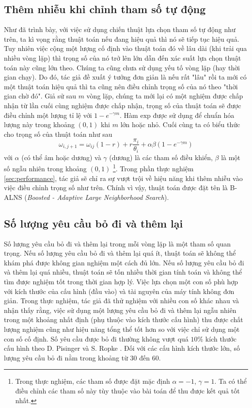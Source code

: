 \subsection{Thêm nhiễu khi chỉnh tham số tự động}
Như đã trình bày, với việc sử dụng chiến thuật lựa chọn tham số tự động như trên, ta kì vọng rằng thuật toán nếu đang hiệu quả thì nó sẽ tiếp tục hiệu quả. Tuy nhiên việc cộng một lượng cố định vào thuật toán đó về lâu dài (khi trải qua nhiều vòng lặp) thì trọng số của nó trở lên lớn dẫn đến xác suất lựa chọn thuật toán này cũng lớn theo. Chúng ta cũng chưa sử dụng yếu tố vòng lặp (hay thời gian chạy). Do đó, tác giả đề xuất ý tưởng đơn giản là nếu rất "lâu" rồi ta mới có một thuật toán hiệu quả thì ta cũng nên điều chỉnh trọng số của nó theo "thời gian chờ đó". Giả sử sau $m$ vòng lặp, chúng ta mới lại có một nghiệm được chấp nhận từ lần cuối cùng nghiệm được chấp nhận, trọng số của thuật toán sẽ được điều chỉnh một lượng tỉ lệ với $1 - e^{-\gamma m}$. Hàm $\text{exp}$ được sử dụng để chuẩn hóa lượng này trong khoảng $(0,1)$ khi $m$ lớn hoặc nhỏ. Cuối cùng ta có biểu thức cho trọng số của thuật toán như sau
\begin{equation}
	\label{eq:boost_adaptive_weight}
	\omega_{i, j+1} = \omega_{ij}(1-r)+r\frac{\pi_i} {\theta_i} + \alpha \beta (1 - e^{-\gamma m})
\end{equation}
với $\alpha$ (có thể âm hoặc dương) và $\gamma$ (dương) là các tham số điều khiển, $\beta$ là một số ngẫu nhiên trong khoảng $(0,1)$ \footnote[1]{Trong thực nghiệm, các tham số được đặt mặc định $\alpha = -1$, $\gamma = 1$. Ta có thể điều chỉnh các tham số này tùy thuộc vào bài toán để thu được kết quả tốt nhất.}. Trong phần thực nghiệm \ref{sec:performance}, tác giả sẽ chỉ ra sự vượt trội về hiệu năng khi thêm nhiễu vào việc điều chỉnh trọng số như trên. Chính vì vậy, thuật toán được đặt tên là B-ALNS (\textit{Boosted - Adaptive Large Neighborhood Search}).

\subsection{Số lượng yêu cầu bỏ đi và thêm lại}
\label{sec:num_rm_req}
Số lượng yêu cầu bỏ đi và thêm lại trong mỗi vòng lặp là một tham số quan trọng. Nếu số lượng yêu cầu bỏ đi và thêm lại quá ít, thuật toán sẽ không thể khám phá được không gian nghiệm một cách đủ lớn. Nếu số lượng yêu cầu bỏ đi và thêm lại quá nhiều, thuật toán sẽ tốn nhiều thời gian tính toán và không thể tìm được nghiệm tốt trong thời gian hợp lý. Việc lựa chọn một con số phù hợp với kích thước của cấu hình (đầu vào) và tài nguyên của máy tính không đơn giản. Trong thực nghiệm, tác giả đã thử nghiệm với nhiều con số khác nhau và nhận thấy rằng, việc sử dụng một lượng yêu cầu bỏ đi và thêm lại ngẫu nhiên trong một khoảng nhất định (phụ thuộc vào kích thước cấu hình) thu được chất lượng nghiệm cũng như hiệu năng tổng thể tốt hơn so với việc chỉ sử dụng một con số cố định. Số yêu cầu được bỏ đi thường không vượt quá $10\%$ kích thước cấu hình theo D. Pisinger và S. Ropke \cite{pisinger2007general}. Đối với các cấu hình kích thước lớn, số lượng yêu cầu bỏ đi nằm trong khoảng từ 30 đến 60.